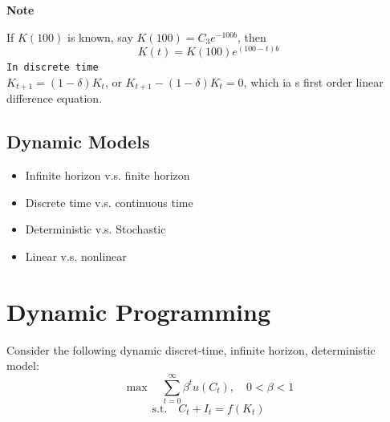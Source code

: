 \documentclass[twoside]{article}
\begin{document}
{\bf Note}

If $K(100)$ is known, say $K(100) = C_3e^{-100b}$, then
$$K(t) = K(100)e^{(100-t)b}$$
\texttt{In discrete time}\\ 
$K_{t+1} = (1- \delta)K_t$, or $K_{t+1} - (1- \delta)K_t = 0$, which ia s first order linear difference equation.

\subsection{Dynamic Models} \begin{itemize}
  \item Infinite horizon v.s. finite horizon
  \item Discrete time v.s. continuous time
  \item Deterministic v.s. Stochastic
  \item Linear v.s. nonlinear
\end{itemize}

\section{Dynamic Programming}

Consider the following dynamic discret-time, infinite horizon, deterministic model:
\begin{equation}
  \max \quad \sum_{t=0}^\infty \beta^t u(C_t), \quad 0 < \beta <1
\end{equation}
\begin{equation}
  \text{s.t.} \quad C_t + I_t = f(K_t) 
\end{equation}
\end{document}
